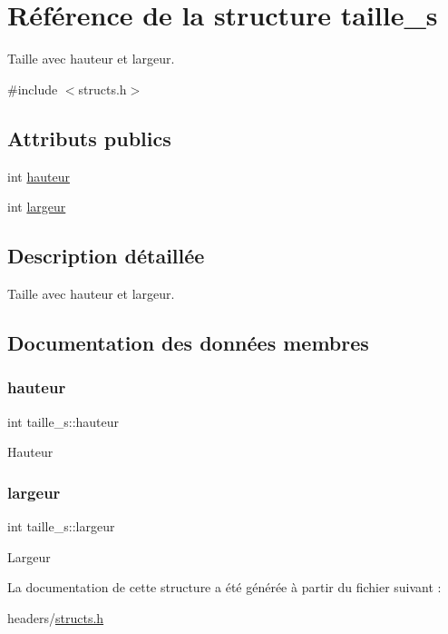 \hypertarget{structtaille__s}{}\section{Référence de la structure taille\+\_\+s}
\label{structtaille__s}


Taille avec hauteur et largeur.  




{\ttfamily \#include $<$structs.\+h$>$}

\subsection*{Attributs publics}
\begin{DoxyCompactItemize}
\item 
int \hyperlink{structtaille__s_a303228861b63c2ae2280fcb3dbc290e0}{hauteur}
\item 
int \hyperlink{structtaille__s_a2dbe2c36f1f6ee42d2ee9abb66c53e96}{largeur}
\end{DoxyCompactItemize}


\subsection{Description détaillée}
Taille avec hauteur et largeur. 

\subsection{Documentation des données membres}
\mbox{\label{structtaille__s_a303228861b63c2ae2280fcb3dbc290e0}} 
\subsubsection{\texorpdfstring{hauteur}{hauteur}}
{\footnotesize\ttfamily int taille\+\_\+s\+::hauteur}

Hauteur \mbox{\label{structtaille__s_a2dbe2c36f1f6ee42d2ee9abb66c53e96}} 
\subsubsection{\texorpdfstring{largeur}{largeur}}
{\footnotesize\ttfamily int taille\+\_\+s\+::largeur}

Largeur 

La documentation de cette structure a été générée à partir du fichier suivant \+:\begin{DoxyCompactItemize}
\item 
headers/\hyperlink{structs_8h}{structs.\+h}\end{DoxyCompactItemize}

